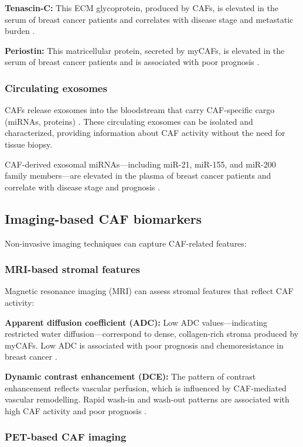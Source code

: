 \textbf{Tenascin-C:} This ECM glycoprotein, produced by CAFs, is elevated in the serum of breast cancer patients and correlates with disease stage and metastatic burden \citep{seth2021}.

\textbf{Periostin:} This matricellular protein, secreted by myCAFs, is elevated in the serum of breast cancer patients and is associated with poor prognosis \citep{seth2021}.

\subsubsection{Circulating exosomes}

CAFs release exosomes into the bloodstream that carry CAF-specific cargo (miRNAs, proteins) \citep{zhao2023}. These circulating exosomes can be isolated and characterized, providing information about CAF activity without the need for tissue biopsy.

CAF-derived exosomal miRNAs---including miR-21, miR-155, and miR-200 family members---are elevated in the plasma of breast cancer patients and correlate with disease stage and prognosis \citep{zhao2023}.

\subsection{Imaging-based CAF biomarkers}

Non-invasive imaging techniques can capture CAF-related features:

\subsubsection{MRI-based stromal features}

Magnetic resonance imaging (MRI) can assess stromal features that reflect CAF activity:

\textbf{Apparent diffusion coefficient (ADC):} Low ADC values---indicating restricted water diffusion---correspond to dense, collagen-rich stroma produced by myCAFs. Low ADC is associated with poor prognosis and chemoresistance in breast cancer \citep{seth2021}.

\textbf{Dynamic contrast enhancement (DCE):} The pattern of contrast enhancement reflects vascular perfusion, which is influenced by CAF-mediated vascular remodelling. Rapid wash-in and wash-out patterns are associated with high CAF activity and poor prognosis \citep{seth2021}.

\subsubsection{PET-based CAF imaging}

